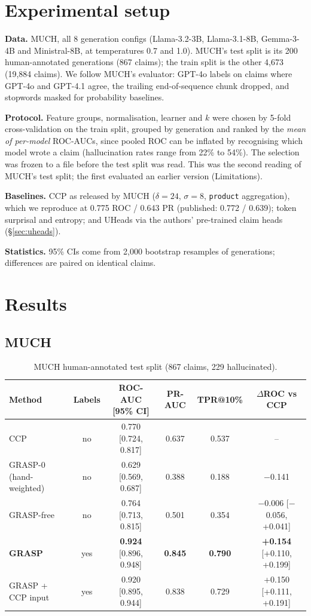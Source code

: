 \documentclass[11pt]{article}
\begin{document}
\section{Experimental setup}
\textbf{Data.} MUCH, all 8 generation configs (Llama-3.2-3B, Llama-3.1-8B, Gemma-3-4B and
Ministral-8B, at temperatures 0.7 and 1.0). MUCH's test split is its 200 human-annotated generations
(867 claims); the train split is the other 4,673 (19,884 claims). We follow MUCH's evaluator:
GPT-4o labels on claims where GPT-4o and GPT-4.1 agree, the trailing end-of-sequence chunk dropped,
and stopwords masked for probability baselines.

\textbf{Protocol.} Feature groups, normalisation, learner and $k$ were chosen by 5-fold
cross-validation on the train split, grouped by generation and ranked by the \emph{mean of
per-model} ROC-AUCs, since pooled ROC can be inflated by recognising which model wrote a claim
(hallucination rates range from 22\% to 54\%). The selection was frozen to a file before the test
split was read. This was the second reading of MUCH's test split; the first evaluated an earlier
version (Limitations).

\textbf{Baselines.} CCP as released by MUCH ($\delta{=}24$, $\sigma{=}8$, \texttt{product}
aggregation), which we reproduce at 0.775 ROC / 0.643 PR (published: 0.772 / 0.639); token
surprisal and entropy; and UHeads \citep{shelmanov-etal-2025-head} via the authors' pre-trained
claim heads (\S\ref{sec:uheads}).

\textbf{Statistics.} 95\% CIs come from 2,000 bootstrap resamples of generations; differences
are paired on identical claims.

\section{Results}
\subsection{MUCH}
\begin{table}[t]
\centering\small
\begin{tabular}{lccccc}
\toprule
Method & Labels & ROC-AUC [95\% CI] & PR-AUC & TPR@10\% & $\Delta$ROC vs CCP \\
\midrule
CCP & no & 0.770 [0.724, 0.817] & 0.637 & 0.537 & -- \\
GRASP-0 (hand-weighted) & no & 0.629 [0.569, 0.687] & 0.388 & 0.188 & $-$0.141 \\
GRASP-free & no & 0.764 [0.713, 0.815] & 0.501 & 0.354 & $-$0.006 [$-$0.056, +0.041] \\
\textbf{GRASP} & yes & \textbf{0.924} [0.896, 0.948] & \textbf{0.845} & \textbf{0.790} & \textbf{+0.154} [+0.110, +0.199] \\
GRASP + CCP input & yes & 0.920 [0.895, 0.944] & 0.838 & 0.729 & +0.150 [+0.111, +0.191] \\
\bottomrule
\end{tabular}
\caption{MUCH human-annotated test split (867 claims, 229 hallucinated).}
\label{tab:main}
\end{table}
\end{document}
